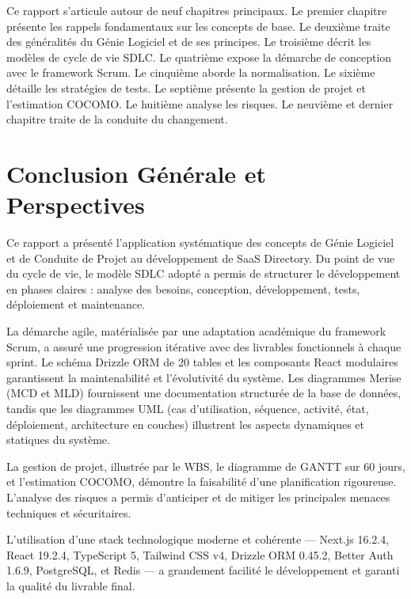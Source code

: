 \documentclass[12pt,a4paper]{article}
\begin{document}
Ce rapport s'articule autour de neuf chapitres principaux. Le premier chapitre présente les rappels fondamentaux sur les concepts de base. Le deuxième traite des généralités du Génie Logiciel et de ses principes. Le troisième décrit les modèles de cycle de vie SDLC. Le quatrième expose la démarche de conception avec le framework Scrum. Le cinquième aborde la normalisation. Le sixième détaille les stratégies de tests. Le septième présente la gestion de projet et l'estimation COCOMO. Le huitième analyse les risques. Le neuvième et dernier chapitre traite de la conduite du changement.
\newpage



\section*{Conclusion Générale et Perspectives}

Ce rapport a présenté l'application systématique des concepts de Génie Logiciel et de Conduite de Projet au développement de SaaS Directory. Du point de vue du cycle de vie, le modèle SDLC adopté a permis de structurer le développement en phases claires : analyse des besoins, conception, développement, tests, déploiement et maintenance.

La démarche agile, matérialisée par une adaptation académique du framework Scrum, a assuré une progression itérative avec des livrables fonctionnels à chaque sprint. Le schéma Drizzle ORM de 20 tables et les composants React modulaires garantissent la maintenabilité et l'évolutivité du système. Les diagrammes Merise (MCD et MLD) fournissent une documentation structurée de la base de données, tandis que les diagrammes UML (cas d'utilisation, séquence, activité, état, déploiement, architecture en couches) illustrent les aspects dynamiques et statiques du système.

La gestion de projet, illustrée par le WBS, le diagramme de GANTT sur 60 jours, et l'estimation COCOMO, démontre la faisabilité d'une planification rigoureuse. L'analyse des risques a permis d'anticiper et de mitiger les principales menaces techniques et sécuritaires.

L'utilisation d'une stack technologique moderne et cohérente --- Next.js 16.2.4, React 19.2.4, TypeScript 5, Tailwind CSS v4, Drizzle ORM 0.45.2, Better Auth 1.6.9, PostgreSQL, et Redis --- a grandement facilité le développement et garanti la qualité du livrable final.
\end{document}
